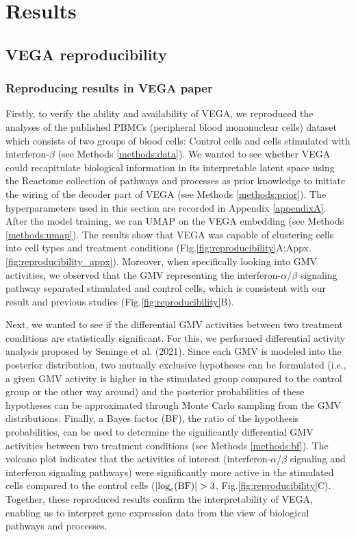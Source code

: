 \chapter{Results}
\section{VEGA reproducibility}\label{results:reproducibility}
\subsection{Reproducing results in VEGA paper}
Firstly, to verify the ability and availability of VEGA\cite{Seninge2021}, we reproduced the analyses of the published PBMCs (peripheral blood mononuclear cells) dataset\cite{Kang2018} which consists of two groups of blood cells: Control cells and cells stimulated with interferon-$\beta$ (see Methods \ref{methods:data}). We wanted to see whether VEGA could recapitulate biological information in its interpretable latent space using the Reactome collection of pathways and processes\cite{Jassal2020} as prior knowledge to initiate the wiring of the decoder part of VEGA (see Methods \ref{methods:prior}). The hyperparameters used in this section are recorded in Appendix \ref{appendixA}. After the model training, we ran UMAP\cite{McInnes2020} on the VEGA embedding (see Methods \ref{methods:umap}). The results show that VEGA was capable of clustering cells into cell types and treatment conditions (Fig.\ref{fig:reproducibility}A;Appx.\ref{fig:reproducibility_appx}). Moreover, when specifically looking into GMV activities, we observed that the GMV representing the interferon-$\alpha$/$\beta$ signaling pathway separated stimulated and control cells, which is consistent with our result and previous studies\cite{Mazewski2020} (Fig.\ref{fig:reproducibility}B).

Next, we wanted to see if the differential GMV activities between two treatment conditions are statistically significant. For this, we performed differential activity analysis proposed by Seninge et al. (2021). Since each GMV is modeled into the posterior distribution, two mutually exclusive hypotheses can be formulated (i.e., a given GMV activity is higher in the stimulated group compared to the control group or the other way around) and the posterior probabilities of these hypotheses can be approximated through Monte Carlo sampling from the GMV distributions. Finally, a Bayes factor\cite{Kass1995,Held2018} (BF), the ratio of the hypothesis probabilities, can be used to determine the significantly differential GMV activities between two treatment conditions (see Methods \ref{methods:bf}). The volcano plot indicates that the activities of interest (interferon-$\alpha$/$\beta$ signaling and interferon signaling pathways) were significantly more active in the stimulated cells compared to the control cells ($|\textnormal{log}_e(\textnormal{BF})|>3$, Fig.\ref{fig:reproducibility}C). Together, these reproduced results confirm the interpretability of VEGA, enabling us to interpret gene expression data from the view of biological pathways and processes.\vspace{7mm}

